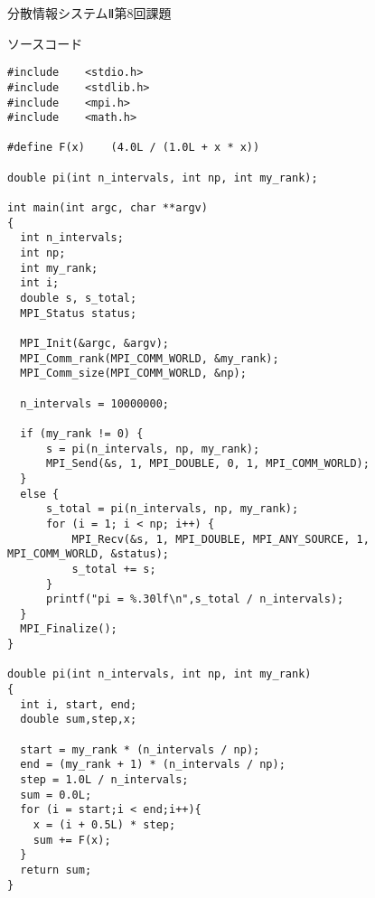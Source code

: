 \documentclass[a4paper, titlepage]{jsarticle}
\begin{document}
	分散情報システムⅡ第8回課題

	ソースコード
	\begin{lstlisting}
#include	<stdio.h>
#include	<stdlib.h>
#include	<mpi.h>
#include	<math.h>

#define	F(x)	(4.0L / (1.0L + x * x))

double pi(int n_intervals, int np, int my_rank);

int main(int argc, char **argv)
{
  int n_intervals;
  int np;
  int my_rank;
  int i;
  double s, s_total;
  MPI_Status status;

  MPI_Init(&argc, &argv);
  MPI_Comm_rank(MPI_COMM_WORLD, &my_rank);
  MPI_Comm_size(MPI_COMM_WORLD, &np);
  
  n_intervals = 10000000;

  if (my_rank != 0) {
	  s = pi(n_intervals, np, my_rank);
	  MPI_Send(&s, 1, MPI_DOUBLE, 0, 1, MPI_COMM_WORLD);
  }
  else {
	  s_total = pi(n_intervals, np, my_rank);
	  for (i = 1; i < np; i++) {
		  MPI_Recv(&s, 1, MPI_DOUBLE, MPI_ANY_SOURCE, 1, MPI_COMM_WORLD, &status);
		  s_total += s;
	  }
	  printf("pi = %.30lf\n",s_total / n_intervals);
  }
  MPI_Finalize();
}

double pi(int n_intervals, int np, int my_rank)
{
  int i, start, end;
  double sum,step,x;
  
  start = my_rank * (n_intervals / np);
  end = (my_rank + 1) * (n_intervals / np);
  step = 1.0L / n_intervals;
  sum = 0.0L;
  for (i = start;i < end;i++){
    x = (i + 0.5L) * step;
    sum += F(x);
  }
  return sum;
}
	\end{lstlisting}
\end{document}
